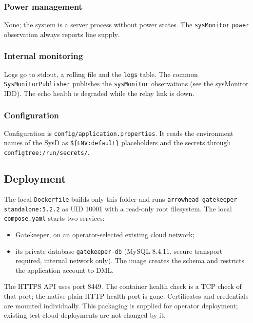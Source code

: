 \documentclass[a4paper]{arrowhead}
\begin{document}
\subsubsection{Power management}

None; the system is a server process without power states. The \texttt{sysMonitor} \texttt{power} observation always reports line supply.

\subsubsection{Internal monitoring}

Logs go to stdout, a rolling file and the \texttt{logs} table. The common \texttt{SysMonitorPublisher} publishes the \texttt{sysMonitor} observations (see the sysMonitor IDD). The echo health is degraded while the relay link is down.

\subsubsection{Configuration}

Configuration is \texttt{config/\allowbreak{}application.\allowbreak{}properties}. It reads the environment names of the SysD as \texttt{\$\{ENV:default\}} placeholders and the secrets through \texttt{configtree:/\allowbreak{}run/\allowbreak{}secrets/}.

\subsection{Deployment}

The local \texttt{Dockerfile} builds only this folder and runs \texttt{arrowhead-\allowbreak{}gatekeeper-\allowbreak{}standalone:5.2.2} as UID 10001 with a read-only root filesystem. The local \texttt{compose.yaml} starts two services:
\begin{itemize}
\item Gatekeeper, on an operator-selected existing cloud network;
\item its private database \texttt{gatekeeper-\allowbreak{}db} (MySQL 8.4.11, secure transport required, internal network only). The image creates the schema and restricts the application account to DML.
\end{itemize}
The HTTPS API uses port 8449. The container health check is a TCP check of that port; the native plain-HTTP health port is gone. Certificates and credentials are mounted individually. This packaging is supplied for operator deployment; existing test-cloud deployments are not changed by it.
\end{document}
